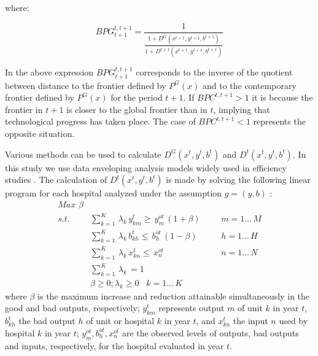 \documentclass[11pt,a4paper,oneside]{article}
\begin{document}
\noindent where:

\begin{equation}
BPG_{t+1}^{t,t+1}=\frac{1}{\frac{1+D^{G}(x^{t+1},y^{t+1},b^{t+1})}{1+D^{t+1}(x^{t+1},y^{t+1},b^{t+1})}}
\end{equation}

In the above expression $BPG_{t+1}^{t,t+1}$ corresponds to the inverse of the quotient between distance to the frontier defined by $P^{G}(x)$ and to the contemporary frontier defined by $P^{G}(x)$ for the period $t+1$. If $BPC^{t,t+1}>1$ it is because the frontier in $t+1$ is closer to the global frontier than in $t$, implying that technological progress has taken place. The case of $BPC^{t,t+1}<1$ represents the opposite situation.

Various methods can be used to calculate $D^{G}(x^{t},y^{t},b^{t})$ and $D^{t}(x^{t},y^{t},b^{t})$. In this study we use data enveloping analysis models \citep{Charnes:1978bf} widely used in efficiency studies \citep{Emrouznejad:2008fr}. The calculation of $D^{t}(x^{t},y^{t},b^{t})$ is made by solving the following linear program for each hospital analyzed under the assumption $g=(y,b)$ \citep{mandal2010environmental}:
%
\begin{equation}
\label{eq:pl1}
\begin{array}{lllll}
Max \,\,  \beta\\
s.t. &\sum_{k=1}^{K} \, \lambda_{k} \, y_{km}^{t}  \geq \,y_{m}^{ot} \, \left( 1+\beta\right) & & & m=1...\,M \\
&\sum_{k=1}^{K} \, \lambda_{k}\, b_{kh}^{t}   \leq \, b_{h}^{ot} \, \left( 1-\beta\right) & & & h=1... \,H \\
&\sum_{k=1}^{K} \, \lambda_{k}\, x_{kn}^{t}   \leq \, x_{n}^{ot} & & &  n=1... \,N \\
&\sum_{k=1}^{K} \, \lambda_{k}\,  = 1 \\
&\beta\geq 0 ;\lambda_{k}\geq 0 \,\,\,\,\, k=1...\,K
\end{array}
\end{equation}
%
\noindent where $\beta$ is the maximum increase and reduction attainable simultaneously in the good and bad outputs, respectively; $y_{km}^{t}$ represents output $m$ of unit $k$ in year $t$, $b_{kh}^{t}$ the bad output $h$ of unit or hospital $k$ in year $t$, and $x_{kn}^{t}$ the input $n$ used by hospital $k$ in year $t$; $y_{m}^{ot}, b_{h}^{ot}, x_{n}^{ot}$ are the observed levels of outputs, bad outputs and inputs, respectively, for the hospital evaluated in year $t$.
\end{document}
